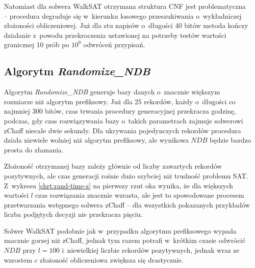 Natomiast dla solwera WalkSAT otrzymana struktura CNF jest problematyczna -- procedura degraduje się w~kierunku losowego przeszukiwania o~wykładniczej złożoności obliczeniowej.
Już dla stu napisów o~długości 40 bitów metoda kończy działanie z~powodu przekroczenia ustawionej na potrzeby testów wartości granicznej 10 prób po $10^9$ odwróceń przypisań.


\subsection{Algorytm \textit{Randomize\_NDB}}

Algorytm \textit{Randomize\_NDB} generuje bazy danych o~znacznie większym rozmiarze niż algorytm prefiksowy. Już dla 25 rekordów, każdy o~długości co najmniej 300 bitów, czas trwania procedury generacyjnej przekracza godzinę,
podczas, gdy czas rozwiązywania bazy o~takich parametrach zajmuje solwerowi zChaff niecałe dwie sekundy. Dla ukrywania pojedynczych rekordów procedura działa niewiele wolniej niż algorytm prefiksowy, ale wynikowa $NDB$ będzie bardzo prosta do złamania.

Złożoność otrzymanej bazy zależy głównie od liczby zawartych rekordów pozytywnych, ale czas generacji rośnie dużo szybciej niż trudność problemu SAT. Z~wykresu \ref{chrt:rand-time-z} na pierwszy rzut oka wynika, że dla większych wartości $l$ czas rozwiązania znacznie wzrasta, ale jest to spowodowane
procesem przetwarzania wstępnego solwera zChaff -- dla wszystkich pokazanych przykładów liczba podjętych decyzji nie przekracza pięciu.

Solwer WalkSAT podobnie jak w~przypadku algorytmu prefiksowego wypada znacznie gorzej niż zChaff, jednak tym razem potrafi w~krótkim czasie odwrócić $NDB$ przy $l=100$ i~niewielkiej liczbie rekordów pozytywnych, jednak wraz ze wzrostem $c$ złożoność obliczeniowa zwiększa się drastycznie.

